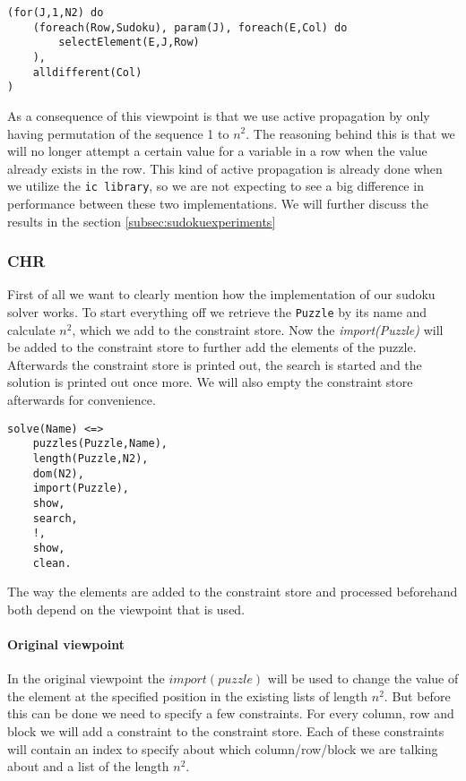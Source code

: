 \begin{lstlisting}
(for(J,1,N2) do
	(foreach(Row,Sudoku), param(J), foreach(E,Col) do
		selectElement(E,J,Row)
	),
	alldifferent(Col)
)
\end{lstlisting}

As a consequence of this viewpoint is that we use active propagation by only having permutation of the sequence 1 to $n^2$.
The reasoning behind this is that we will no longer attempt a certain value for a variable in a row when the value already exists in the row. 
This kind of active propagation is already done when we utilize the \texttt{ic library}, so we are not expecting to see a big difference in performance between these two implementations.
We will further discuss the results in the section \ref{subsec:sudokuexperiments}
\newpage
\subsubsection{CHR}
First of all we want to clearly mention how the implementation of our sudoku solver works.
To start everything off we retrieve the \texttt{Puzzle} by its name and calculate $n^2$, which we add to the constraint store.
Now the \textsl{import(Puzzle)} will be added to the constraint store to further add the elements of the puzzle.
Afterwards the constraint store is printed out, the search is started and the solution is printed out once more. 
We will also empty the constraint store afterwards for convenience.

\begin{lstlisting}
solve(Name) <=>
	puzzles(Puzzle,Name),
	length(Puzzle,N2),
	dom(N2),
	import(Puzzle),
	show,
	search,
	!,
	show,
	clean.
\end{lstlisting}

The way the elements are added to the constraint store and processed beforehand both depend on the viewpoint that is used.

\paragraph*{Original viewpoint}
In the original viewpoint the \texttt{$import(puzzle)$} will be used to change the value of the element at the specified position in the existing lists of length $n^{2}$. 
But before this can be done we need to specify a few constraints.
For every column, row and block we will add a constraint to the constraint store.
Each of these constraints will contain an index to specify about which column/row/block we are talking about and a list of the length $n^2$.\\

